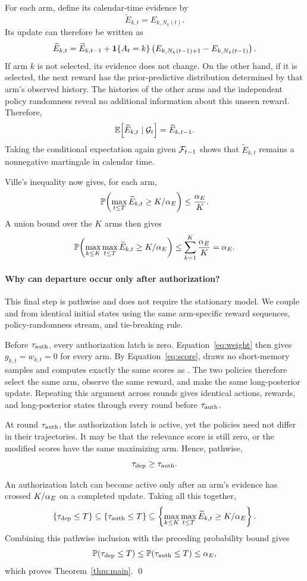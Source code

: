 For each arm, define its calendar-time evidence by
\[
\widetilde E_{k,t}=E_{k,N_k(t)}.
\]
Its update can therefore be written as
\[
\widetilde E_{k,t}
=
\widetilde E_{k,t-1}
+
\mathbf 1\{A_t=k\}
\left(
E_{k,N_k(t-1)+1}-E_{k,N_k(t-1)}
\right).
\]
If arm $k$ is not selected, its evidence does not change.
On the other hand, if it is selected, the next reward has the prior-predictive distribution determined by that arm's observed history.
The histories of the other arms and the independent policy randomness reveal no additional information about this
unseen reward.
Therefore,
\[
\mathbb E\!\left[
\widetilde E_{k,t}
\mid
\mathcal G_t
\right]
=
\widetilde E_{k,t-1}.
\]
Taking the conditional expectation again given $\mathcal F_{t-1}$ shows that
$\widetilde E_{k,t}$ remains a nonnegative martingale in calendar time.

Ville's inequality now gives, for each arm,
\[
\mathbb P\!\left(
\max_{t\leq T}\widetilde E_{k,t}
\geq
K/\alpha_E
\right)
\leq
\frac{\alpha_E}{K}.
\]
A union bound over the $K$ arms then gives
\[
\mathbb P\!\left(
\max_{k\leq K}\max_{t\leq T}\widetilde E_{k,t}
\geq
K/\alpha_E
\right)
\leq
\sum_{k=1}^K\frac{\alpha_E}{K}
=
\alpha_E.
\]

\paragraph{Why can departure occur only after authorization?}
This final step is pathwise and does not require the stationary model.
We couple \method{} and \anchor{} from identical initial states using the same
arm-specific reward sequences, policy-randomness stream, and tie-breaking rule.

Before $\tau_{\mathrm{auth}}$, every authorization latch is zero.
Equation~\eqref{eq:weight} then gives $g_{k,t}=w_{k,t}=0$ for every arm.
By Equation~\eqref{eq:score}, \method{} draws no short-memory samples and computes
exactly the same scores as \anchor{}.
The two policies therefore select the same arm, observe the same reward, and make the same long-posterior update.
Repeating this argument across rounds gives identical actions, rewards, and long-posterior states through every round before $\tau_{\mathrm{auth}}$.

At round $\tau_{\mathrm{auth}}$, the authorization latch is active, yet the policies need not differ in their trajectories.
It may be that the relevance score is still zero, or the modified scores have the same maximizing arm.
Hence, pathwise,
\[
\tau_{\mathrm{dep}}\geq\tau_{\mathrm{auth}}.
\]

An authorization latch can become active only after an arm's evidence has
crossed $K/\alpha_E$ on a completed update.
Taking all this together,
\[
\{\tau_{\mathrm{dep}}\leq T\}
\subseteq
\{\tau_{\mathrm{auth}}\leq T\}
\subseteq
\left\{
\max_{k\leq K}\max_{t\leq T}\widetilde E_{k,t}
\geq K/\alpha_E
\right\}.
\]
Combining this pathwise inclusion with the preceding probability bound gives
\[
\mathbb P(\tau_{\mathrm{dep}}\leq T)
\leq
\mathbb P(\tau_{\mathrm{auth}}\leq T)
\leq
\alpha_E,
\]
which proves Theorem~\ref{thm:main}. \qed

